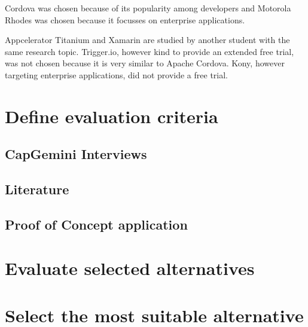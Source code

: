 Cordova was chosen because of its popularity among developers and  Motorola Rhodes was chosen because it focusses on enterprise applications. 

Appcelerator Titanium and Xamarin are studied by another student with the same research topic. Trigger.io, however kind to provide an extended free trial, was not chosen because it is very similar to Apache Cordova. Kony, however targeting enterprise applications, did not provide a free trial.


\section{Define evaluation criteria}

\subsection{CapGemini Interviews}

\subsection{Literature}

\subsection{Proof of Concept application}


\section{Evaluate selected alternatives}


\section{Select the most suitable alternative}


